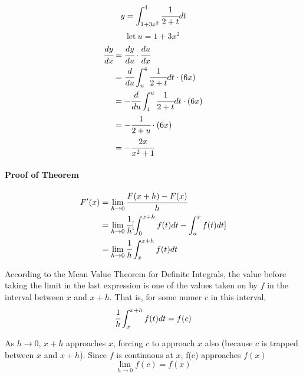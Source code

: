 \documentclass{article}
\begin{document}
            \[y=\int_{1+3x^2}^4 \cfrac{1}{2+t}dt\]
            \[\text{let}\ u=1+3x^2\]
            \begin{equation}
                \begin{aligned}
                    \cfrac{dy}{dx}&=\cfrac{dy}{du}\cdot\cfrac{du}{dx}\\
                    &=\cfrac{d}{du}\int_u^4 \cfrac{1}{2+t}dt\cdot(6x)\\
                    &=-\cfrac{d}{du}\int_4^u\cfrac{1}{2+t}dt\cdot(6x)\\
                    &=-\cfrac{1}{2+u}\cdot(6x)\\
                    &=-\cfrac{2x}{x^2+1}
                \end{aligned}
            \end{equation}
            \paragraph{Proof of Theorem}
            \begin{equation}
                \begin{aligned}
                    F'(x)&=\lim\limits_{h\to 0}\cfrac{F(x+h)-F(x)}{h}\\
                    &=\lim\limits_{h\to 0}\cfrac{1}{h}[\int_0^{x+h}f(t)dt-\int_a^x f(t)dt]\\
                    &=\lim\limits_{h\to 0}\cfrac{1}{h}\int_x^{x+h}f(t)dt\\
                \end{aligned}
            \end{equation}
            \par According to the Mean Value Theorem for Definite Integrals, the value before taking the limit in the last expression is one of the values taken on by $f$ in the interval between $x$ and $x+h$. That is, for some numer $c$ in this interval,\\
            \begin{equation}
                \cfrac{1}{h}\int_x^{x+h}f(t)dt=f(c)
            \end{equation}
            \par As $h\to 0$, $x+h$ approaches $x$, forcing $c$ to approach $x$ also (because $c$ is trapped between $x$ and $x+h$). Since $f$ is continuous at $x$, f(c) approaches $f(x)$
            \begin{equation}
                \lim\limits_{h\to 0}f(c)=f(x)
            \end{equation}
\end{document}
